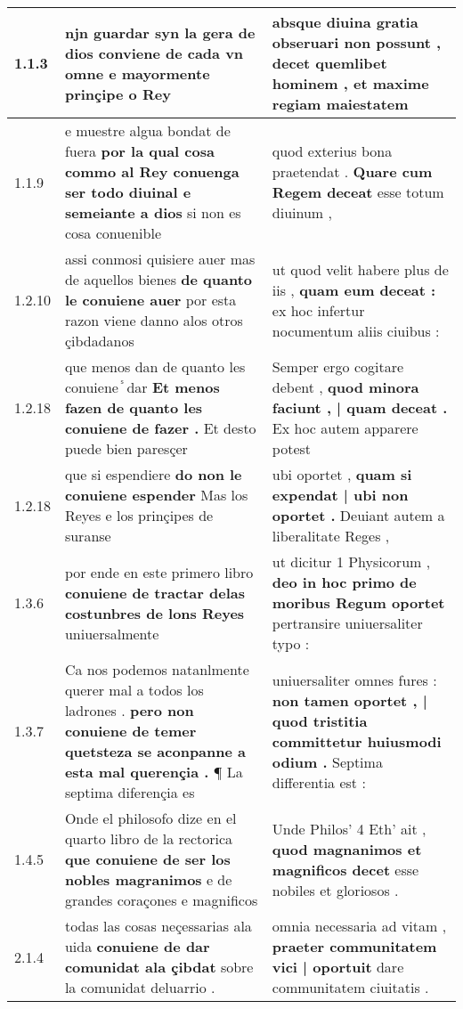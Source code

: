 \begin{tabular}{|p{1cm}|p{6.5cm}|p{6.5cm}|}

\hline
1.1.3 & njn guardar \textbf{ syn la gera de dios conviene de cada vn omne } e mayormente prinçipe o Rey & absque diuina gratia obseruari non possunt , \textbf{ decet quemlibet hominem , } et maxime regiam maiestatem \\\hline
1.1.9 & e muestre algua bondat de fuera \textbf{ por la qual cosa commo al Rey conuenga ser todo diuinal e semeiante a dios } si non es cosa conuenible & quod exterius bona praetendat . \textbf{ Quare cum Regem deceat } esse totum diuinum , \\\hline
1.2.10 & assi conmosi quisiere auer mas de aquellos bienes \textbf{ de quanto le conuiene auer } por esta razon viene danno alos otros çibdadanos & ut quod velit habere plus de iis , \textbf{ quam eum deceat : } ex hoc infertur nocumentum aliis ciuibus : \\\hline
1.2.18 & que menos dan de quanto les conuiene ᷤ dar \textbf{ Et menos fazen de quanto les conuiene de fazer . } Et desto puede bien paresçer & Semper ergo cogitare debent , \textbf{ quod minora faciunt , | quam deceat . } Ex hoc autem apparere potest \\\hline
1.2.18 & que si espendiere \textbf{ do non le conuiene espender } Mas los Reyes e los prinçipes de suranse & ubi oportet , \textbf{ quam si expendat | ubi non oportet . } Deuiant autem a liberalitate Reges , \\\hline
1.3.6 & por ende en este primero libro \textbf{ conuiene de tractar delas costunbres de lons Reyes } uniuersalmente & ut dicitur 1 Physicorum , \textbf{ deo in hoc primo de moribus Regum oportet } pertransire uniuersaliter typo : \\\hline
1.3.7 & Ca nos podemos natanlmente querer mal a todos los ladrones . \textbf{ pero non conuiene de temer quetsteza se aconpanne a esta mal querençia . } ¶ La septima diferençia es & uniuersaliter omnes fures : \textbf{ non tamen oportet , | quod tristitia committetur huiusmodi odium . } Septima differentia est : \\\hline
1.4.5 & Onde el philosofo dize en el quarto libro de la rectorica \textbf{ que conuiene de ser los nobles magranimos } e de grandes coraçones e magnificos & Unde Philos’ 4 Eth’ ait , \textbf{ quod magnanimos et magnificos decet } esse nobiles et gloriosos . \\\hline
2.1.4 & todas las cosas neçessarias ala uida \textbf{ conuiene de dar comunidat ala çibdat } sobre la comunidat deluarrio . & omnia necessaria ad vitam , \textbf{ praeter communitatem vici | oportuit } dare communitatem ciuitatis . \\\hline

\end{tabular}
